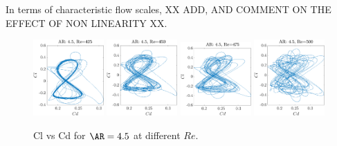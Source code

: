 In terms of characteristic flow scales, XX ADD, AND COMMENT ON THE EFFECT OF NON LINEARITY XX.
\begin{figure}
  \centering
  \includegraphics[width=0.24\textwidth]{./fig/nnl/ClCdAR4.5RE425.png}
  \includegraphics[width=0.24\textwidth]{./fig/nnl/ClCdAR4.5RE450.png}
  \includegraphics[width=0.24\textwidth]{./fig/nnl/ClCdAR4.5RE475.png}
  \includegraphics[width=0.24\textwidth]{./fig/nnl/ClCdAR4.5RE500.png}
  \caption{Cl vs Cd for $\AR=4.5$ at different $Re$.}
  \label{fig:ClCd}
\end{figure}

